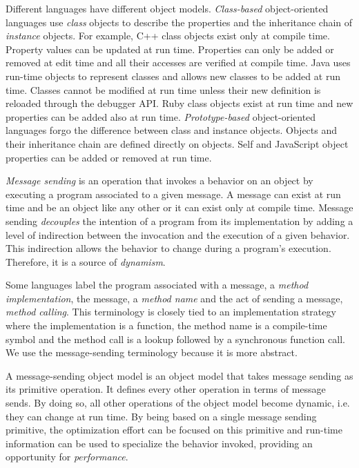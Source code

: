 Different languages have different object models. \textit{Class-based}
object-oriented languages use \textit{class} objects to describe the properties
and the inheritance chain of \textit{instance} objects. For example, C++ class
objects exist only at compile time. Property values can be updated at run time.
Properties can only be added or removed at edit time and all their accesses are
verified at compile time. Java uses run-time objects to represent classes and
allows new classes to be added at run time.  Classes cannot be modified at run
time unless their new definition is reloaded through the debugger API. Ruby
class objects exist at run time and new properties can be added also at run
time. \textit{Prototype-based} object-oriented languages forgo the difference
between class and instance objects. Objects and their inheritance chain are
defined directly on objects. Self and JavaScript object properties can be
added or removed at run time. 

\textit{Message sending} is an operation that invokes a behavior on an object by
executing a program associated to a given message.  A message can exist at run
time and be an object like any other or it can exist only at compile time.
Message sending \textit{decouples} the intention of a program from its
implementation by adding a level of indirection between the invocation and the
execution of a given behavior. This indirection allows the behavior to change
during a program's execution. Therefore, it is a source of \textit{dynamism}.

Some languages label the program associated with a message, a \textit{method
implementation}, the message, a \textit{method name} and the act of sending a
message, \textit{method calling}. This terminology is closely tied to an
implementation strategy where the implementation is a function, the method name
is a compile-time symbol and the method call is a lookup followed by a
synchronous function call. We use the message-sending terminology because it is
more abstract. 

A message-sending object model is an object model that takes message sending as
its primitive operation. It defines every other operation in terms of message
sends. By doing so, all other operations of the object model become dynamic,
i.e. they can change at run time. By being based on a single message sending
primitive, the optimization effort can be focused on this primitive and
run-time information can be used to specialize the behavior invoked, providing
an opportunity for \textit{performance}. 

